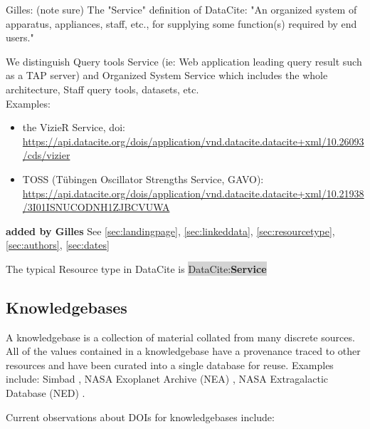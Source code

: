 \documentclass[11pt,a4paper]{ivoa}
\newcommand{\dataciteterm}[1]{\colorbox{lightgray}{DataCite:\textbf{#1}}}
\begin{document}
{\color{red} Gilles: (note sure)
    The "Service" definition of DataCite: "An organized system of apparatus, appliances, staff, etc., for supplying some function(s) required by end users."

    We distinguish Query tools Service (ie: Web application leading query result such as a TAP server) and Organized System Service which includes the whole architecture, Staff query tools, datasets, etc. \\
    
    Examples:
    \begin{itemize}
    	\item the VizieR Service, doi:\\ \url{https://api.datacite.org/dois/application/vnd.datacite.datacite+xml/10.26093/cds/vizier}
    	\item TOSS (Tübingen Oscillator Strengths Service, GAVO):\\ \url{https://api.datacite.org/dois/application/vnd.datacite.datacite+xml/10.21938/3I01ISNUCODNH1ZJBCVUWA}
    \end{itemize} 

}

\textbf{\color{red} added by Gilles}
See \ref{sec:landingpage}, \ref{sec:linkeddata}, \ref{sec:resourcetype}, \ref{sec:authors}, \ref{sec:dates}


The typical Resource type in DataCite is \dataciteterm{Service}

\subsection{Knowledgebases}
\label{sec:intro:kdbs}

A knowledgebase is a collection of material collated from many discrete sources.
All of the values contained in a knowledgebase have a provenance traced to other resources and have been curated into a single database for reuse.
Examples include: Simbad \citep[as originally described in, ][]{2000A&AS..143....9W}, NASA Exoplanet Archive (NEA) \citep{NEA12-doi2bib} \citep[as originally described in,][]{2013PASP..125..989A}, NASA Extragalactic Database (NED) \citep{NED1-doi2bib} \citep[as originally described in,][]{1991ASSL..171...89H}. 

Current observations about DOIs for knowledgebases include:
\end{document}
